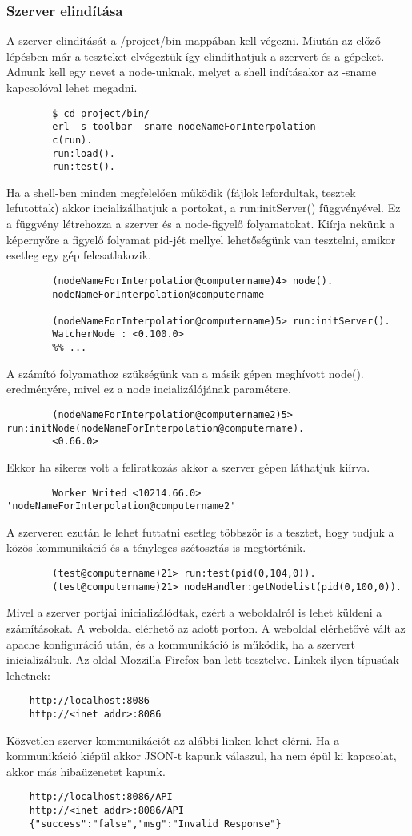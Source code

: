 \subsubsection{Szerver elindítása}
	A szerver elindítását a /project/bin mappában kell végezni. Miután az előző lépésben már a teszteket elvégeztük így elindíthatjuk a szervert és a gépeket.
	Adnunk kell egy nevet a node-unknak, melyet a shell indításakor az -sname kapcsolóval lehet megadni.
	\begin{verbatim}
		$ cd project/bin/
		erl -s toolbar -sname nodeNameForInterpolation
		c(run).
		run:load().
		run:test().
	\end{verbatim}
	Ha a shell-ben minden megfelelően működik (fájlok lefordultak, tesztek lefutottak) akkor incializálhatjuk a portokat, a run:initServer() függvényével. Ez a függvény létrehozza a szerver és a node-figyelő folyamatokat. Kiírja nekünk a képernyőre a figyelő folyamat pid-jét mellyel lehetőségünk van tesztelni, amikor esetleg egy gép felcsatlakozik. 
	\begin{verbatim}
		(nodeNameForInterpolation@computername)4> node().
		nodeNameForInterpolation@computername

		(nodeNameForInterpolation@computername)5> run:initServer().
		WatcherNode : <0.100.0>
		%% ...
	\end{verbatim}
	A számító folyamathoz szükségünk van a másik gépen meghívott node(). eredményére, mivel ez a node incializálójának paramétere. 
	\begin{verbatim}
		(nodeNameForInterpolation@computername2)5> run:initNode(nodeNameForInterpolation@computername).
		<0.66.0>
	\end{verbatim}
	Ekkor ha sikeres volt a feliratkozás akkor a szerver gépen láthatjuk kiírva.
	\begin{verbatim}
		Worker Writed <10214.66.0> 'nodeNameForInterpolation@computername2'
	\end{verbatim}
	A szerveren ezután le lehet futtatni esetleg többször is a tesztet, hogy tudjuk a közös kommunikáció és a tényleges szétosztás is megtörténik.
	\begin{verbatim}
		(test@computername)21> run:test(pid(0,104,0)).
		(test@computername)21> nodeHandler:getNodelist(pid(0,100,0)).
	\end{verbatim}
	Mivel a szerver portjai inicializálódtak, ezért a weboldalról is lehet küldeni a számításokat. 
	A weboldal elérhető az adott porton. A weboldal elérhetővé vált az apache konfiguráció után, és a kommunikáció is működik, ha a szervert inicializáltuk. Az oldal Mozzilla Firefox-ban lett tesztelve. Linkek ilyen típusúak lehetnek: 
	\begin{verbatim}
	http://localhost:8086
	http://<inet addr>:8086
	\end{verbatim}
	Közvetlen szerver kommunikációt az alábbi linken lehet elérni. 
	Ha a kommunikáció kiépül akkor JSON-t kapunk válaszul, ha nem épül ki kapcsolat, akkor más hibaüzenetet kapunk. 
	\begin{verbatim}
	http://localhost:8086/API
	http://<inet addr>:8086/API 
	{"success":"false","msg":"Invalid Response"}
	\end{verbatim}

